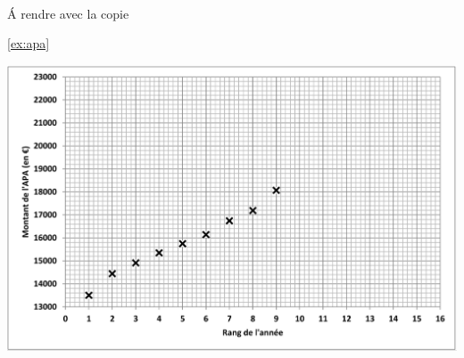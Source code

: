 \documentclass[a4paper,12pt]{exam}
\author{\ }
\begin{document}
%	

	
	

\ 
\ 
\\

\newpage











\newpage

\appendix

\section{}\label{sec:nuage}


\begin{center}
	 {\Large \'A rendre avec la copie
	 
	 \ref{ex:apa}}
 
 	\vspace*{1cm}
	
	\includegraphics[scale=0.43]{img/graph}
	

\end{center}

\label{annexe}
	\label{LastPage}
	
\end{document}
